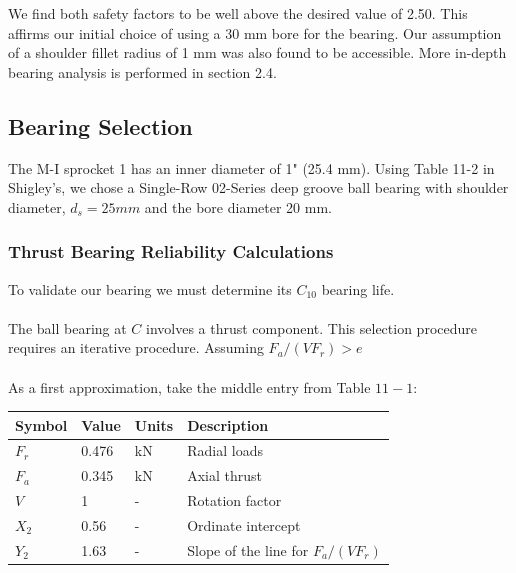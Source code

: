 \documentclass[letterpaper,12pt]{article}
\begin{document}
\noindent We find both safety factors to be well above the desired value of 2.50. This affirms our initial choice of using a 30 mm bore for the bearing. Our assumption of a shoulder fillet radius of 1 mm was also found to be accessible. More in-depth bearing analysis is performed in section 2.4.

\subsection{Bearing Selection}
\noindent The M-I sprocket 1 has an inner diameter of 1" (25.4 mm). Using Table 11-2 in Shigley's, we chose a Single-Row 02-Series deep groove ball bearing with shoulder diameter, $d_s = 25mm$ and the bore diameter 20 mm.

\subsubsection{Thrust Bearing Reliability Calculations}
To validate our bearing we must determine its $C_{10}$ bearing life.\\ \\
The ball bearing at $C$ involves a thrust component. This selection procedure requires an iterative procedure. Assuming $F _ { a } / \left( V F _ { r } \right) > e$ \\ \\
As a first approximation, take the middle entry from Table $11 - 1 :$ \\

\begin{tabular}{ |p{1.5cm}||p{1.2cm}|p{2cm}|p{7cm}|  }
		\hline
		Symbol & Value & Units & Description\\
		\hline
		$F _ { r }$ & 0.476 & kN & Radial loads\\
        $F _ { a }$ & 0.345 & kN  & Axial thrust \\			
	    $V$ & 1 & -  & Rotation factor\\
	    $X _ { 2 }$ & 0.56 & -  &  Ordinate intercept \\
	    $Y _ { 2 }$ &1.63 & -  &  Slope of the line for $F _ { a } / \left( V F _ { r } \right)$\\
	    
	    \hline
\end{tabular}

%	
\end{document}
